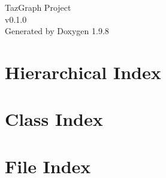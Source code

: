 \documentclass[twoside]{book}
\newcommand{\+}{\discretionary{\mbox{\scriptsize$\hookleftarrow$}}{}{}}
\newcommand{\clearemptydoublepage}{%
    \newpage{\pagestyle{empty}\cleardoublepage}%
  }
\begin{document}
  \raggedbottom
    \hypersetup{pageanchor=false,
                bookmarksnumbered=true,
                pdfencoding=unicode
               }
  \begin{titlepage}
  \vspace*{7cm}
  \begin{center}%
  {\Large Taz\+Graph Project}\\
  [1ex]\large v0.\+1.\+0 \\
  \vspace*{1cm}
  {\large Generated by Doxygen 1.9.8}\\
  \end{center}
  \end{titlepage}
  \clearemptydoublepage
  \tableofcontents
  \clearemptydoublepage
  \hypersetup{pageanchor=true}

\chapter{Hierarchical Index}

\chapter{Class Index}

\chapter{File Index}

\end{document}
